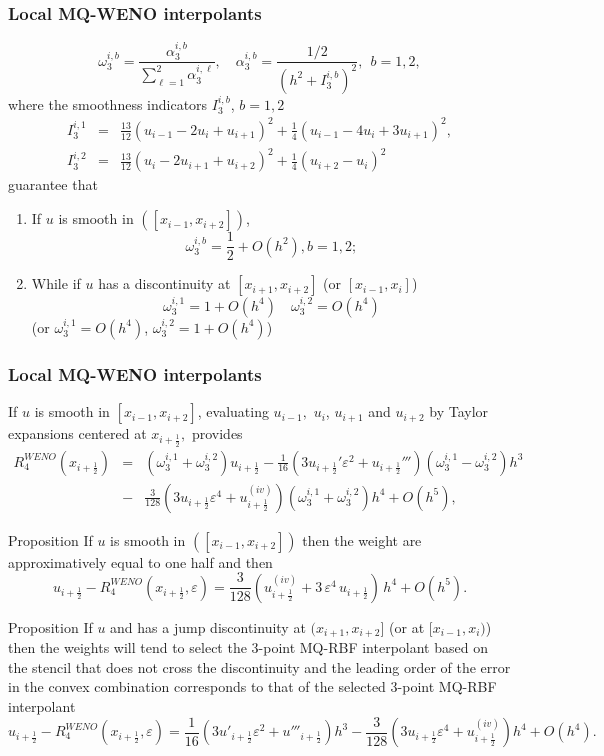 \documentclass[xcolor=dvipsnames,9pt,mathserif]{beamer}
\newcommand\xunmezzo{x_{i+\frac12}}
\newcommand\uunmezzo{u_{i+\frac12}}
\newcommand\eps{{\varepsilon}}
\begin{document}
\begin{frame}
     \frametitle{Local MQ-WENO interpolants}

$$\omega_{3}^{i,b}=\frac{\alpha_{3}^{i,b}}{\sum_{\ell=1}^{2} \alpha^{i,\ell}_{3} },
\quad
\alpha_{3}^{i,b}={ \frac{1/2}{(h^2 +I_3^{i,b})^{2}} }, \ \ b=1,2,
$$
where the smoothness indicators $I_3^{i,b}$, $b=1,2$
\begin{eqnarray*}
I_3^{i,1}&=&\frac{13}{12} (u_{i-1}-2u_{i}+u_{i+1})^2+
\frac{1}{4}(u_{i-1}-4u_{i}+3u_{i+1})^2,
\\
I_3^{i,2}&=&\frac{13}{12}(u_{i}-2u_{i+1}+u_{i+2})^2
+\frac{1}{4}(u_{i+2}-u_{i})^2
\end{eqnarray*}
guarantee that

\begin{enumerate}
\item If $u$ is smooth in $([x_{i-1}, x_{i+2}])$,
$$\omega^{i,b}_3=\frac{1}{2}+O({h^2}), b=1,2;$$
\item While if  $u$ has a discontinuity at $[x_{i+1}, x_{i+2}]$ (or
  $[x_{i-1}, x_{i}]$)
  $$
  \omega^{i,1}_3=1+O({h^4})\quad \omega^{i,2}_3=O({h^4}) $$
(or $\omega^{i,1}_3=O({h^4})$, $\omega^{i,2}_3=1+O({h^4})$)

\end{enumerate}
     \end{frame}
     \begin{frame}

     \frametitle{Local MQ-WENO interpolants}
If $u$ is smooth in $ [x_{i-1}, x_{i+2}]$,  evaluating $u_{i-1},$ $u_i$, $u_{i+1}$ and $u_{i+2}$ by Taylor expansions centered at $\xunmezzo,$ provides
\begin{eqnarray*}
R^{WENO}_{4}(x_{i+\frac12})
&= &(\omega_3^{i,1}+\omega_3^{i,2})\uunmezzo- \frac{1}{16}(3 u_{i+\frac12}' \varepsilon^2 + u_{i+\frac12}''')(\omega_3^{i,1}-\omega_3^{i,2})h^3\\
&-&\frac{3}{128}(3u_{i+\frac12}\varepsilon^4+u^{(iv)}_{i+\frac12})(\omega_3^{i,1}+\omega_3^{i,2}) h^4+ O(h^5), \end{eqnarray*}

\begin{block}{Proposition}
If {$u$ is smooth in $([x_{i-1},x_{i+2}])$} then the weight are approximatively equal to one half and then
$$\uunmezzo - R^{WENO}_{4}(x_{i+\frac12},\varepsilon) =
 \frac{3}{128}(u^{(iv)}_{i+\frac12} + 3 \, \eps^4 \, u_{i+\frac12}) \, h^4+ O(h^5).
$$
\end{block}
\begin{block}{Proposition}
If {$u$}
  and has
a jump discontinuity at { $(x_{i+1},x_{i+2}]$} (or at { $[x_{i-1},x_{i})$}) then the weights  will tend to select the 3-point MQ-RBF interpolant based on the stencil  that does not
cross the  discontinuity and the
leading order of the error in the convex combination corresponds to
that of the selected  3-point MQ-RBF interpolant
$$\uunmezzo- R_4^{WENO}(x_{i+\frac12},\varepsilon)
=
\frac{1}{16}(3 u'_{i+\frac12} \varepsilon^2 + u'''_{i+\frac12}) h^3
-\frac{3}{128}(3u_{i+\frac12}\varepsilon^4+u^{(iv)}_{i+\frac12}) h^4+  O(h^4).
$$
\end{block}
     \end{frame}
\end{document}
